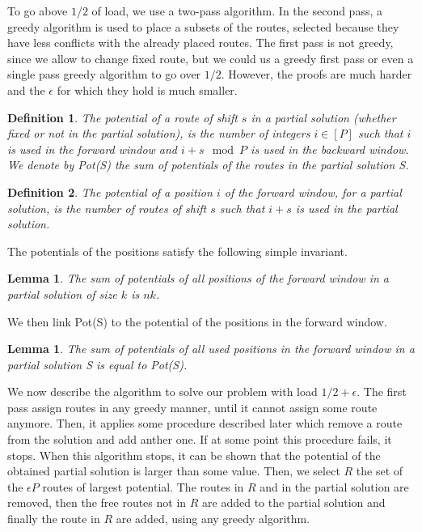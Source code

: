 \documentclass[10pt, conference, letterpaper]{IEEEtran}
\newtheorem{lemma}[theorem]{Lemma}
\newtheorem{definition}{Definition}
\begin{document}
To go above $1/2$ of load, we use a two-pass algorithm. In the second pass, a greedy algorithm is used 
to place a subsets of the routes, selected because they have less conflicts with the already placed 
routes. The first pass is not greedy, since we allow to change fixed route, but we could us a greedy first
pass or even a single pass greedy algorithm to go over $1/2$. However, the proofs are much harder and 
the $\epsilon$ for which they hold is much smaller.

\begin{definition}
The potential of a route of shift $s$ in a partial solution (whether fixed or not in the partial solution),
is the number of integers $i \in [P]$ such that $i$ is used in the forward window and $i+s \mod P$ is used in the backward window. We denote by Pot(S) the sum of potentials of the routes in the partial solution S.
\end{definition} 


\begin{definition}
The potential of a position $i$ of the forward window, for a partial solution, is the number of routes of shift $s$ such that $i+s$ is used in the partial solution. 
\end{definition}

The potentials of the positions satisfy the following simple invariant.
\begin{lemma}\label{lemma:inv}
The sum of potentials of all positions of the forward window in a partial solution of size $k$ is $nk$.  
\end{lemma}

We then link Pot(S) to the potential of the positions in the forward window.
\begin{lemma}\label{lemma:pot_pos}
The sum of potentials of all used positions in the forward window in a partial solution S is equal to Pot(S).  
\end{lemma}
 

We now describe the algorithm to solve our problem with load $1/2 + \epsilon$. The first pass assign routes in any
greedy manner, until it cannot assign some route anymore. Then, it applies some procedure described later which 
remove a route from the solution and add anther one. If at some point this procedure fails, it stops.
When this algorithm stops, it can be shown that the potential of the obtained partial solution is larger
than some value. Then, we select $R$ the set of the $\epsilon P$ routes of largest potential. The routes in $R$ and in the partial solution are removed, then the free routes not in $R$ are added to the partial solution and 
finally the route in $R$ are added, using any greedy algorithm.
\end{document}
